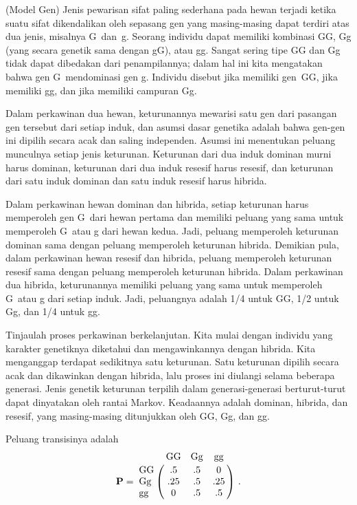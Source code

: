 \begin{example}\label{exam 11.1.7}
(Model Gen) Jenis pewarisan sifat paling sederhana pada hewan terjadi ketika
suatu sifat dikendalikan oleh sepasang gen yang masing-masing dapat terdiri
atas dua jenis, misalnya G~dan~g. Seorang individu dapat memiliki kombinasi GG,
Gg (yang secara genetik sama dengan gG), atau gg. Sangat sering tipe GG dan Gg
tidak dapat dibedakan dari penampilannya; dalam hal ini kita mengatakan bahwa
gen G~mendominasi gen g. Individu disebut  jika memiliki gen~GG,
 jika memiliki gg, dan  jika memiliki campuran Gg.
\par
Dalam perkawinan dua hewan, keturunannya mewarisi satu gen dari pasangan gen
tersebut dari setiap induk, dan asumsi dasar genetika adalah bahwa gen-gen ini
dipilih secara acak dan saling independen. Asumsi ini menentukan peluang
munculnya setiap jenis keturunan. Keturunan dari dua induk dominan murni harus
dominan, keturunan dari dua induk resesif harus resesif, dan keturunan dari satu
induk dominan dan satu induk resesif harus hibrida.
\par
Dalam perkawinan hewan dominan dan hibrida, setiap keturunan harus memperoleh
gen G~dari hewan pertama dan memiliki peluang yang sama untuk memperoleh G~atau
g dari hewan kedua. Jadi, peluang memperoleh keturunan dominan sama dengan
peluang memperoleh keturunan hibrida. Demikian pula, dalam perkawinan hewan
resesif dan hibrida, peluang memperoleh keturunan resesif sama dengan peluang
memperoleh keturunan hibrida. Dalam perkawinan dua hibrida, keturunannya
memiliki peluang yang sama untuk memperoleh G~atau g dari setiap induk. Jadi,
peluangnya adalah 1/4 untuk GG, 1/2 untuk Gg, dan 1/4 untuk gg.
\par
Tinjaulah proses perkawinan berkelanjutan. Kita mulai dengan individu yang
karakter genetiknya diketahui dan mengawinkannya dengan hibrida. Kita
menganggap terdapat sedikitnya satu keturunan. Satu keturunan dipilih secara
acak dan dikawinkan dengan hibrida, lalu proses ini diulangi selama beberapa
generasi. Jenis genetik keturunan terpilih dalam generasi-generasi berturut-turut
dapat dinyatakan oleh rantai Markov. Keadaannya adalah dominan, hibrida, dan
resesif, yang masing-masing ditunjukkan oleh GG, Gg, dan gg.
\par
Peluang transisinya adalah
$$
\mat{P} = \bordermatrix{
          &\mbox{GG} & \mbox{Gg} & \mbox{gg} \cr
\mbox{GG} &  .5      & .5        &   0       \cr
\mbox{Gg} & .25      & .5        & .25       \cr
\mbox{gg} &   0      & .5        &  .5       }\ . 
$$
\end{example}

